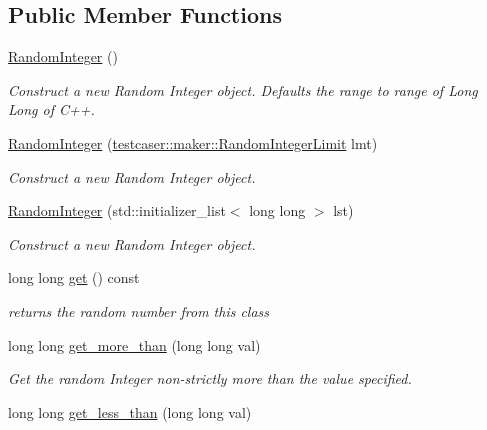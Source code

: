 \subsection*{Public Member Functions}
\begin{DoxyCompactItemize}
\item 
\mbox{\hyperlink{classtestcaser_1_1maker_1_1types_1_1RandomInteger_aee8b13d2d5bad5355924313b56d321c4}{Random\+Integer}} ()
\begin{DoxyCompactList}\small\item\em Construct a new Random Integer object. Defaults the range to range of Long Long of C++. \end{DoxyCompactList}\item 
\mbox{\hyperlink{classtestcaser_1_1maker_1_1types_1_1RandomInteger_a026bc0b7613813494afce8066fb997ea}{Random\+Integer}} (\mbox{\hyperlink{structtestcaser_1_1maker_1_1RandomIntegerLimit}{testcaser\+::maker\+::\+Random\+Integer\+Limit}} lmt)
\begin{DoxyCompactList}\small\item\em Construct a new Random Integer object. \end{DoxyCompactList}\item 
\mbox{\hyperlink{classtestcaser_1_1maker_1_1types_1_1RandomInteger_ae126be1bc8d04520b063924e57ccedc6}{Random\+Integer}} (std\+::initializer\+\_\+list$<$ long long $>$ lst)
\begin{DoxyCompactList}\small\item\em Construct a new Random Integer object. \end{DoxyCompactList}\item 
long long \mbox{\hyperlink{classtestcaser_1_1maker_1_1types_1_1RandomInteger_a3b7754ca1c579f58b959ca6adb483a51}{get}} () const
\begin{DoxyCompactList}\small\item\em returns the random number from this class \end{DoxyCompactList}\item 
long long \mbox{\hyperlink{classtestcaser_1_1maker_1_1types_1_1RandomInteger_ace51a32acc0f219b70aa00d1cd2604c5}{get\+\_\+more\+\_\+than}} (long long val)
\begin{DoxyCompactList}\small\item\em Get the random Integer non-\/strictly more than the value specified. \end{DoxyCompactList}\item 
long long \mbox{\hyperlink{classtestcaser_1_1maker_1_1types_1_1RandomInteger_afe7ef6baf52d095f5b17ad4f8d9e5f1a}{get\+\_\+less\+\_\+than}} (long long val)

\end{DoxyCompactItemize}
